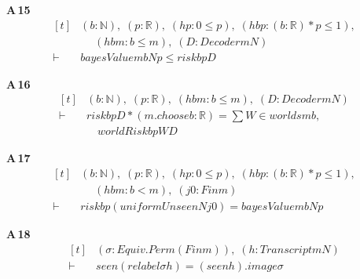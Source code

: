 \noindent\textbf{A\,15}\quad{}
{\footnotesize\[ \begin{aligned}[t]
&(\mathit{b} : \mathbb{N} ),\; (\mathit{p} : \mathbb{R} ),\; (\mathit{hp} : 0 \leq \mathit{p}),\; (\mathit{hbp} : (\mathit{b} : \mathbb{R} ) * \mathit{p} \leq 1),\\
&\quad \; (\mathit{hbm} : \mathit{b} \leq \mathit{m}),\; (\mathit{D} : \mathit{Decoder} \mathit{m} \mathit{N})\\
\vdash\;&\mathit{bayesValue} \mathit{m} \mathit{b} \mathit{N} \mathit{p} \leq \mathit{risk} \mathit{b} \mathit{p} \mathit{D}
\end{aligned} \]}

\noindent\textbf{A\,16}\quad{}
{\footnotesize\[ \begin{aligned}[t]
&(\mathit{b} : \mathbb{N} ),\; (\mathit{p} : \mathbb{R} ),\; (\mathit{hbm} : \mathit{b} \leq \mathit{m}),\; (\mathit{D} : \mathit{Decoder} \mathit{m} \mathit{N})\\
\vdash\;&\mathit{risk} \mathit{b} \mathit{p} \mathit{D} * (\mathit{m}.\mathit{choose} \mathit{b} : \mathbb{R} ) = \textstyle\sum \mathit{W} \in \mathit{worlds} \mathit{m} \mathit{b},\\
&\quad \mathit{worldRisk} \mathit{b} \mathit{p} \mathit{W} \mathit{D}
\end{aligned} \]}

\noindent\textbf{A\,17}\quad{}
{\footnotesize\[ \begin{aligned}[t]
&(\mathit{b} : \mathbb{N} ),\; (\mathit{p} : \mathbb{R} ),\; (\mathit{hp} : 0 \leq \mathit{p}),\; (\mathit{hbp} : (\mathit{b} : \mathbb{R} ) * \mathit{p} \leq 1),\\
&\quad \; (\mathit{hbm} : \mathit{b} < \mathit{m}),\; (\mathit{j0} : \mathit{Fin} \mathit{m})\\
\vdash\;&\mathit{risk} \mathit{b} \mathit{p} (\mathit{uniformUnseen} \mathit{N} \mathit{j0}) = \mathit{bayesValue} \mathit{m} \mathit{b} \mathit{N} \mathit{p}
\end{aligned} \]}

\noindent\textbf{A\,18}\quad{}
{\footnotesize\[ \begin{aligned}[t]
&(\sigma : \mathit{Equiv}.\mathit{Perm} (\mathit{Fin} \mathit{m})),\; (\mathit{h} : \mathit{Transcript} \mathit{m} \mathit{N})\\
\vdash\;&\mathit{seen} (\mathit{relabel} \sigma \mathit{h}) = (\mathit{seen} \mathit{h}).\mathit{image} \sigma
\end{aligned} \]}

